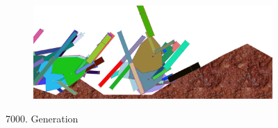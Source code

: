 \begin{figure}[H]
\begin{subfigure}[b]{0.45\textwidth}
              \includegraphics[width=\linewidth,center]{graphics/simulation-results/4_gen7000_4}
              \caption{\label{fig:gen7000_4}}
            \end{subfigure}
            \caption{7000. Generation \label{fig:gen7000}}
          \end{figure}

